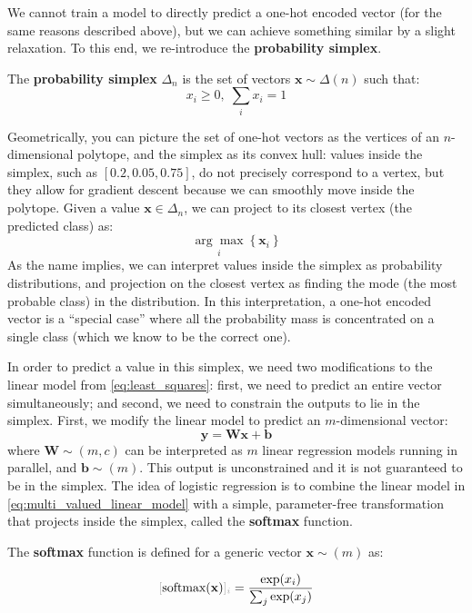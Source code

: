 We cannot train a model to directly predict a one-hot encoded vector (for the same reasons described above), but we can achieve something similar by a slight relaxation. To this end, we re-introduce the \textbf{probability simplex}.

\begin{definition}
The \textbf{probability simplex} $\Delta_n$ is the set of vectors $\mathbf{x} \sim \Delta(n)$ such that:
%
$$
x_i \ge 0, \; \sum_i x_i=1
$$
%
\end{definition}

Geometrically, you can picture the set of one-hot vectors as the vertices of an $n$-dimensional polytope, and the simplex as its convex hull: values inside the simplex, such as $[0.2, 0.05, 0.75]$, do not precisely correspond to a vertex, but they allow for gradient descent because we can smoothly move inside the polytope. Given a value $\mathbf{x} \in \Delta_n$, we can project to its closest vertex (the predicted class) as:
%
$$
\underset{i}{\arg\max} \left\{ \mathbf{x}_i \right\}
$$
%
As the name implies, we can interpret values inside the simplex as probability distributions, and projection on the closest vertex as finding the mode (the most probable class) in the distribution. In this interpretation, a one-hot encoded vector is a “special case” where all the probability mass is concentrated on a single class (which we know to be the correct one).

In order to predict a value in this simplex, we need two modifications to the linear model from \eqref{eq:least_squares}: first, we need to predict an entire vector simultaneously; and second, we need to constrain the outputs to lie in the simplex. First, we modify the linear model to predict an $m$-dimensional vector:
%
\begin{equation}
\mathbf{y} =\mathbf{W}\mathbf{x}+\mathbf{b}
\label{eq:multi_valued_linear_model}
\end{equation}
%
where $\mathbf{W} \sim (m,c)$ can be interpreted as $m$ linear regression models running in parallel, and $\mathbf{b} \sim(m)$. This output is unconstrained and it is not guaranteed to be in the simplex. The idea of logistic regression is to combine the linear model in \eqref{eq:multi_valued_linear_model} with a simple, parameter-free transformation that projects inside the simplex, called the \textbf{softmax} function.

\begin{definition} \addbottle
The \textbf{softmax} function is defined for a generic vector $\mathbf{x} \sim(m)$ as:

\begin{equation}
\idx{\textnormal{softmax}(\mathbf{x})}{i} = \frac{\exp(x_i)}{\sum_j\exp(x_j)}
\label{eq:softmax}
\end{equation}

\end{definition}


